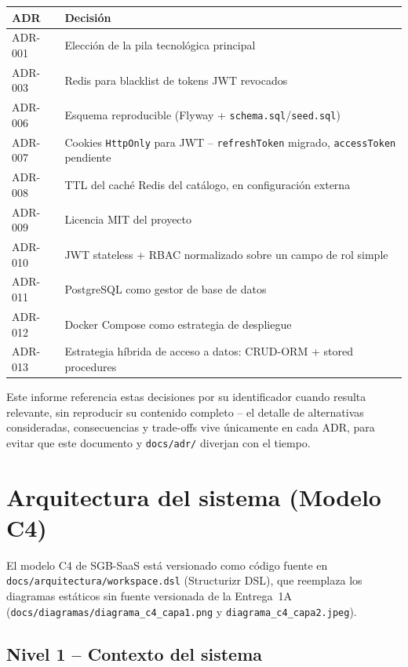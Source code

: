 \documentclass[12pt,a4paper]{article}
\begin{document}
\begin{center}
\small
\begin{tabularx}{\linewidth}{|l|X|}
\hline
\rowcolor{verdeuteq}
\color{white}\textbf{ADR} & \color{white}\textbf{Decisión} \\
\hline
ADR-001 & Elección de la pila tecnológica principal \\
ADR-003 & Redis para blacklist de tokens JWT revocados \\
ADR-006 & Esquema reproducible (Flyway + \texttt{schema.sql}/\texttt{seed.sql}) \\
ADR-007 & Cookies \texttt{HttpOnly} para JWT -- \texttt{refreshToken} migrado, \texttt{accessToken} pendiente \\
ADR-008 & TTL del caché Redis del catálogo, en configuración externa \\
ADR-009 & Licencia MIT del proyecto \\
ADR-010 & JWT stateless + RBAC normalizado sobre un campo de rol simple \\
ADR-011 & PostgreSQL como gestor de base de datos \\
ADR-012 & Docker Compose como estrategia de despliegue \\
ADR-013 & Estrategia híbrida de acceso a datos: CRUD-ORM + stored procedures \\
\hline
\end{tabularx}
\end{center}

Este informe referencia estas decisiones por su identificador cuando
resulta relevante, sin reproducir su contenido completo -- el detalle de
alternativas consideradas, consecuencias y trade-offs vive únicamente en
cada ADR, para evitar que este documento y \texttt{docs/adr/} diverjan
con el tiempo.

\section{Arquitectura del sistema (Modelo C4)}

El modelo C4 de SGB-SaaS está versionado como código fuente en
\texttt{docs/arquitectura/workspace.dsl} (Structurizr DSL), que
reemplaza los diagramas estáticos sin fuente versionada de la Entrega~1A
(\texttt{docs/diagramas/diagrama\_c4\_capa1.png} y
\texttt{diagrama\_c4\_capa2.jpeg}).

\subsection{Nivel 1 -- Contexto del sistema}
\end{document}
